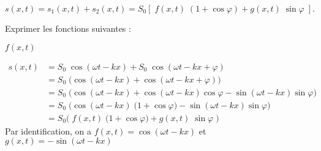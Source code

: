 \begin{equation*}
	s \left(x,t\right) = s_1 \left(x,t\right) + s_2 \left(x,t\right) = S_0 \left[ \; f\left(x,t\right)\; \left( 1+\cos \varphi \right) + g\left(x,t\right) \; \sin \varphi \; \right].
\end{equation*}

\debutEntrainement

\begin{minipage}{0.32\linewidth}
	\vspace{10pt}
	Exprimer les fonctions suivantes :
\end{minipage}
\hspace*{0cm}
\begin{minipage}{0.67\linewidth}
	\begin{multicols}{2}

	\begin{enonce}
	$f\left(x,t\right)$
	\end{enonce}


	\begin{corrige}
		\begin{align*}
			s\left(x,t\right) & = S_0 \; \cos \left(\omega t - k x\right) + S_0 \; \cos \left(\omega t - k x + \varphi\right) \\
			& = S_0 \; \big( \cos \left(\omega t - k x\right) + \cos \left(\omega t - k x + \varphi\right) \big)\\
			& = S_0 \; \big( \cos \left(\omega t - k x\right) + \cos \left(\omega t - k x\right)\cos \varphi - \sin \left(\omega t - k x\right)\sin \varphi \big)\\
			& = S_0 \; \big( \cos \left(\omega t - k x\right) \; \big(1 +\cos \varphi \big) - \sin \left(\omega t - k x\right)\sin \varphi \big)\\
			& = S_0 \big( \; f\left(x,t\right)\; \big( 1+\cos \varphi \big) + g\left(x,t\right) \; \sin \varphi \; \big)
		\end{align*}
	Par identification, on a $f\left(x,t\right)=\cos \left(\omega t - k x\right)$ et $g\left(x,t\right)=-\sin \left(\omega t - k x\right)$
	\end{corrige}



\end{multicols}
\end{minipage}
